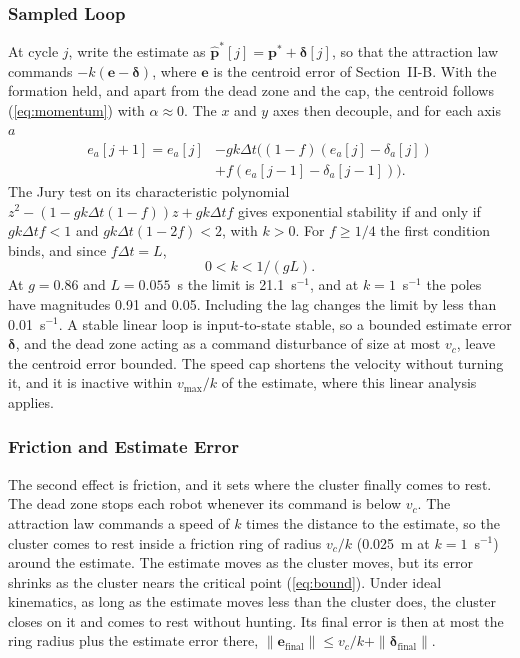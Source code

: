 \documentclass[lettersize,journal]{IEEEtran}
\newcommand{\rev}[1]{#1}
\begin{document}
\subsubsection{Sampled Loop}
At cycle $j$, write the estimate as $\hat{\mathbf{p}}^*[j] = \mathbf{p}^* + \boldsymbol{\delta}[j]$, so that the attraction law commands $-k(\mathbf{e} - \boldsymbol{\delta})$, where $\mathbf{e}$ is the centroid error of Section~II-B. With the formation held, and apart from the dead zone and the cap, the centroid follows (\ref{eq:momentum}) with $\alpha \approx 0$. The $x$ and $y$ axes then decouple, and for each axis $a$
\begin{equation}\label{eq:cl}
\begin{split}
e_a[j{+}1] = e_a[j] &- gk\Delta t\bigl((1-f)(e_a[j] - \delta_a[j])\\
&+ f(e_a[j-1] - \delta_a[j-1])\bigr).
\end{split}
\end{equation}
The Jury test on its characteristic polynomial $z^2 - (1 - gk\Delta t(1-f))z + gk\Delta t f$ gives exponential stability if and only if $gk\Delta t f < 1$ and $gk\Delta t(1-2f) < 2$, with $k > 0$. For $f \ge 1/4$ the first condition binds, and since $f\Delta t = L$,
\begin{equation}\label{eq:kmax}
0 < k < 1/(gL).
\end{equation}
At $g = 0.86$ and $L = 0.055$~s the limit is \rev{21.1}~s$^{-1}$, and at $k = 1$~s$^{-1}$ the poles have magnitudes \rev{0.91} and \rev{0.05}. Including the lag changes the limit by less than 0.01~s$^{-1}$.
A stable linear loop is input-to-state stable, so a bounded estimate error $\boldsymbol{\delta}$, and the dead zone acting as a command disturbance of size at most $v_c$, leave the centroid error bounded. The speed cap shortens the velocity without turning it, and it is inactive within $v_{\max}/k$ of the estimate, where this linear analysis applies.

\subsubsection{Friction and Estimate Error}
The second effect is friction, and it sets where the cluster finally comes to rest. The dead zone stops each robot whenever its command is below $v_c$. The attraction law commands a speed of $k$ times the distance to the estimate, so the cluster comes to rest inside a friction ring of radius $v_c/k$ (0.025~m at $k = 1$~s$^{-1}$) around the estimate. The estimate moves as the cluster moves, but its error shrinks as the cluster nears the critical point (\ref{eq:bound}). Under ideal kinematics, as long as the estimate moves less than the cluster does, the cluster closes on it and comes to rest without hunting. Its final error is then at most the ring radius plus the estimate error there, $\|\mathbf{e}_{\text{final}}\| \le v_c/k + \|\boldsymbol{\delta}_{\text{final}}\|$.
\end{document}
